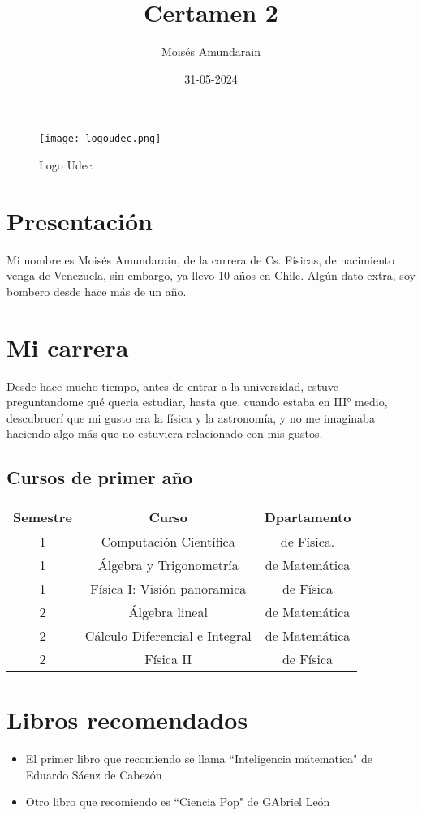 \documentclass[12pt]{article}
\begin{document}
\author{Moisés Amundarain}
\date{31-05-2024}
\title{Certamen 2}
\maketitle
\begin{figure}
	\begin{center}		\texttt{[image: logoudec.png]}
	\caption{Logo Udec}
	\end{center}
  \label{logoudec}
\end{figure}
\newpage
\section{Presentación}
Mi nombre es Moisés Amundarain, de la carrera de Cs. Físicas, de nacimiento venga de Venezuela, sin embargo, ya llevo 10 años en Chile. Algún dato extra, soy bombero desde hace más de un año.
\section{Mi carrera}
Desde hace mucho tiempo, antes de entrar a la universidad, estuve preguntandome qué queria estudiar, hasta que, cuando estaba en III° medio, descubrucrí que mi gusto era la física y la astronomía, y no me imaginaba haciendo algo más que no estuviera relacionado con mis gustos.
\subsection{Cursos de primer año}
\begin{center}
	\begin{tabular}{c|c|c}
		Semestre & Curso & Dpartamento \\ \hline
		1 & Computación Científica & de Física. \\ 
		1 & Álgebra y Trigonometría & de Matemática \\
		1 & Física I: Visión panoramica & de Física \\ 
		2 & Álgebra lineal & de Matemática \\
		2 & Cálculo Diferencial e Integral & de Matemática \\ 
		2 & Física II & de Física
	\end{tabular}
\end{center}
\section{Libros recomendados}
	\begin{itemize}
		\item El primer libro que recomiendo se llama ``Inteligencia mátematica" de Eduardo Sáenz de Cabezón \cite{libro1}
		\item Otro libro que recomiendo es ``Ciencia Pop"  de GAbriel León \cite{libro2}
	\end{itemize}
\newpage
\end{document}
